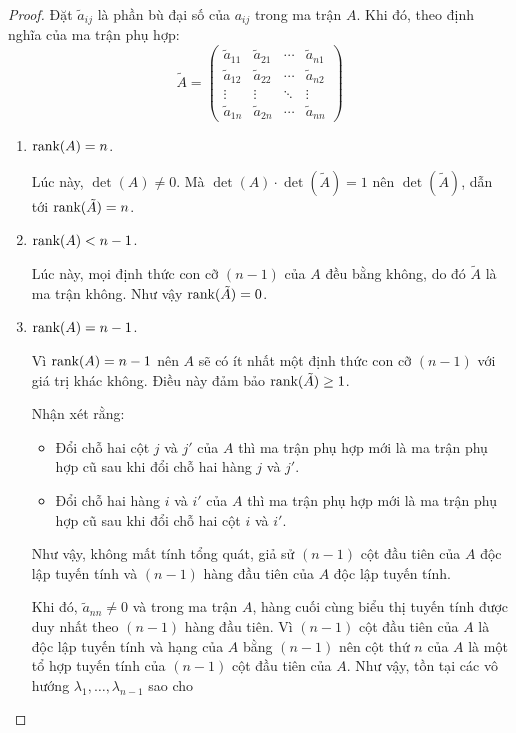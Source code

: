 \documentclass[class=nhvh-linear-algebra,crop=false]{standalone}
\begin{document}
\begin{proof}
    \par Đặt $\tilde{a}_{ij}$ là phần bù đại số của $a_{ij}$ trong ma trận $A$. Khi đó, theo định nghĩa của ma trận phụ hợp:
    \[
        \tilde{A} =
        \begin{pmatrix}
            \tilde{a}_{11} & \tilde{a}_{21} & \cdots & \tilde{a}_{n1} \\
            \tilde{a}_{12} & \tilde{a}_{22} & \cdots & \tilde{a}_{n2} \\
            \vdots         & \vdots         & \ddots & \vdots         \\
            \tilde{a}_{1n} & \tilde{a}_{2n} & \cdots & \tilde{a}_{nn}
        \end{pmatrix}
    \]
    \begin{enumerate}[label = \textbf{Trường hợp \arabic*.},itemindent=2cm]
        \item $\text{rank}(A) = n$.
              \par Lúc này, $\det(A)\ne 0$. Mà $\det(A)\cdot\det(\tilde{A}) = 1$ nên $\det(\tilde{A})$, dẫn tới $\text{rank}(\tilde{A}) = n$.
        \item $\text{rank}(A) < n - 1$.
              \par Lúc này, mọi định thức con cỡ $(n-1)$ của $A$ đều bằng không, do đó $\tilde{A}$ là ma trận không. Như vậy $\text{rank}(\tilde{A}) = 0$.
        \item $\text{rank}(A) = n - 1$.
              \par Vì $\text{rank}(A) = n - 1$ nên $A$ sẽ có ít nhất một định thức con cỡ $(n-1)$ với giá trị khác không. Điều này đảm bảo $\text{rank}(\tilde{A})\ge 1$.
              \par Nhận xét rằng:
              \begin{itemize}
                  \item Đổi chỗ hai cột $j$ và $j'$ của $A$ thì ma trận phụ hợp mới là ma trận phụ hợp cũ sau khi đổi chỗ hai hàng $j$ và $j'$.
                  \item Đổi chỗ hai hàng $i$ và $i'$ của $A$ thì ma trận phụ hợp mới là ma trận phụ hợp cũ sau khi đổi chỗ hai cột $i$ và $i'$.
              \end{itemize}
              \par Như vậy, không mất tính tổng quát, giả sử $(n-1)$ cột đầu tiên của $A$ độc lập tuyến tính và $(n-1)$ hàng đầu tiên của $A$ độc lập tuyến tính.
              \par Khi đó, $\tilde{a}_{nn}\ne 0$ và trong ma trận $A$, hàng cuối cùng biểu thị tuyến tính được duy nhất theo $(n-1)$ hàng đầu tiên.
              Vì $(n-1)$ cột đầu tiên của $A$ là độc lập tuyến tính và hạng của $A$ bằng $(n-1)$ nên cột thứ $n$ của $A$ là một tổ hợp tuyến tính của $(n-1)$ cột đầu tiên của $A$. Như vậy, tồn tại các vô hướng $\lambda_{1}, \ldots, \lambda_{n-1}$ sao cho


\end{enumerate}
\end{proof}
\end{document}
